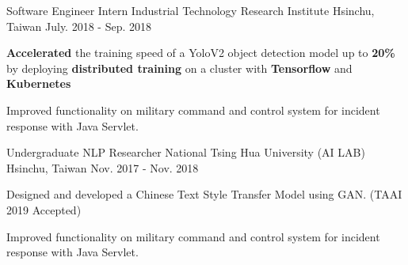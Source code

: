 


\begin{cventries}







\cventry
{Software Engineer Intern} %
{Industrial Technology Research Institute} %
{Hsinchu, Taiwan} %
{July. 2018 - Sep. 2018} %
{ %
\begin{cvitems}
\item {\textbf{Accelerated} the training speed of a YoloV2 object detection model up to \textbf{20\%} by deploying \textbf{distributed training} on a cluster with \textbf{Tensorflow} and \textbf{Kubernetes}}
\item {Improved functionality on military command and control system for incident response with Java Servlet.}
\end{cvitems}
}


\cventry
{Undergraduate NLP Researcher} %
{National Tsing Hua University (AI LAB)} %
{Hsinchu, Taiwan} %
{Nov. 2017 - Nov. 2018} %
{ %
\begin{cvitems}
\item {Designed and developed a Chinese Text Style Transfer Model using GAN. (TAAI 2019 Accepted)}
\item {Improved functionality on military command and control system for incident response with Java Servlet.}
\end{cvitems}
}


\end{cventries}